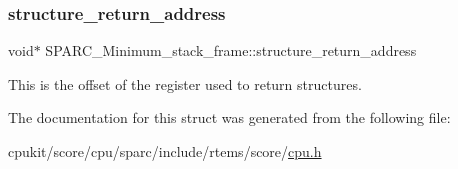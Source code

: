 \subsubsection{\texorpdfstring{structure\_return\_address}{structure\_return\_address}}
{\footnotesize\ttfamily void$\ast$ S\+P\+A\+R\+C\+\_\+\+Minimum\+\_\+stack\+\_\+frame\+::structure\+\_\+return\+\_\+address}

This is the offset of the register used to return structures. 

The documentation for this struct was generated from the following file\+:\begin{DoxyCompactItemize}
\item 
cpukit/score/cpu/sparc/include/rtems/score/\mbox{\hyperlink{sparc_2include_2rtems_2score_2cpu_8h}{cpu.\+h}}\end{DoxyCompactItemize}
